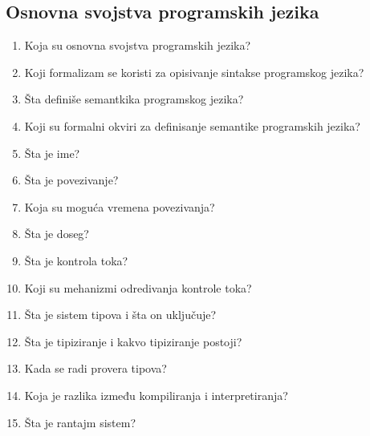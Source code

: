 \documentclass[main.tex]{subfiles}
\begin{document}
\begin{multicols}{2}
\subsection{Osnovna svojstva programskih jezika}
\begin{enumerate}
\item Koja su osnovna svojstva programskih jezika?
\item Koji formalizam se koristi za opisivanje sintakse programskog jezika?
\item Šta definiše semantkika programskog jezika?
\item Koji su formalni okviri za definisanje semantike programskih jezika?
\item Šta je ime?
\item Šta je povezivanje?
\item Koja su moguća vremena povezivanja?
\item Šta je doseg?
\item Šta je kontrola toka?
\item Koji su mehanizmi odredivanja kontrole toka?
\item Šta je sistem tipova i šta on uključuje?
\item Šta je tipiziranje i kakvo tipiziranje postoji?
\item Kada se radi provera tipova?
\item Koja je razlika između kompiliranja i interpretiranja?
\item Šta je rantajm sistem?
\end{enumerate}

\end{multicols}
\end{document}
